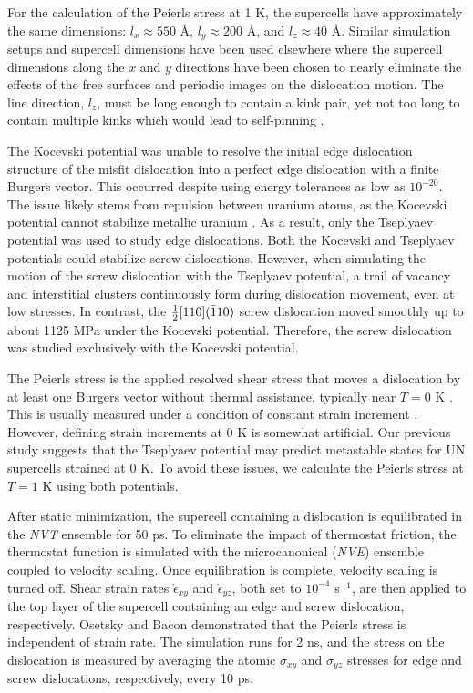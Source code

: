 \documentclass[applsci,article,submit,pdftex,moreauthors]{Definitions/mdpi}
\newcommand{\?}{\stackrel{?}{=}}
\begin{document}
For the calculation of the Peierls stress at 1 K, the supercells have approximately the same dimensions: $l_x \approx 550$ \AA, $l_y \approx 200$ \AA, and $l_z \approx 40$ \AA. Similar simulation setups and supercell dimensions have been used elsewhere \cite{Osetsky2003, Olmsted2005, Cho2017, Dang2019, Kaloni2023} where the supercell dimensions along the $x$ and $y$ directions have been chosen to nearly eliminate the effects of the free surfaces and periodic images on the dislocation motion. The line direction, $l_z$, must be long enough to contain a kink pair, yet not too long to contain multiple kinks which would lead to self-pinning \cite{Gilbert2011}.

The Kocevski potential was unable to resolve the initial edge dislocation structure of the misfit dislocation into a perfect edge dislocation with a finite Burgers vector. This occurred despite using energy tolerances as low as $10^{-20}$. The issue likely stems from repulsion between uranium atoms, as the Kocevski potential cannot stabilize metallic uranium \cite{AbdulHameed2024}. As a result, only the Tseplyaev potential was used to study edge dislocations. Both the Kocevski and Tseplyaev potentials could stabilize screw dislocations. However, when simulating the motion of the screw dislocation with the Tseplyaev potential, a trail of vacancy and interstitial clusters continuously form during dislocation movement, even at low stresses. In contrast, the $\frac{1}{2} [110] ( \Bar{1} 1 0 )$ screw dislocation moved smoothly up to about 1125 MPa under the Kocevski potential. Therefore, the screw dislocation was studied exclusively with the Kocevski potential.

The Peierls stress is the applied resolved shear stress that moves a dislocation by at least one Burgers vector without thermal assistance, typically near $T = 0$ K \cite{Hull2011}. This is usually measured under a condition of constant strain increment \cite{Puls1976, Osetsky2003}. However, defining strain increments at 0 K is somewhat artificial. Our previous study \cite{AbdulHameed2024} suggests that the Tseplyaev potential may predict metastable states for UN supercells strained at 0 K. To avoid these issues, we calculate the Peierls stress at $T = 1$ K using both potentials.

After static minimization, the supercell containing a dislocation is equilibrated in the \textit{NVT} ensemble for 50 ps. To eliminate the impact of thermostat friction, the thermostat function is simulated with the microcanonical (\textit{NVE}) ensemble coupled to velocity scaling. Once equilibration is complete, velocity scaling is turned off. Shear strain rates $\Dot{\epsilon}_{xy}$ and $\Dot{\epsilon}_{yz}$, both set to $10^{-4}$ s$^{-1}$, are then applied to the top layer of the supercell containing an edge and screw dislocation, respectively. Osetsky and Bacon \cite{Osetsky2003} demonstrated that the Peierls stress is independent of strain rate. The simulation runs for 2 ns, and the stress on the dislocation is measured by averaging the atomic $\sigma_{xy}$ and $\sigma_{yz}$ stresses for edge and screw dislocations, respectively, every 10 ps.
\end{document}
